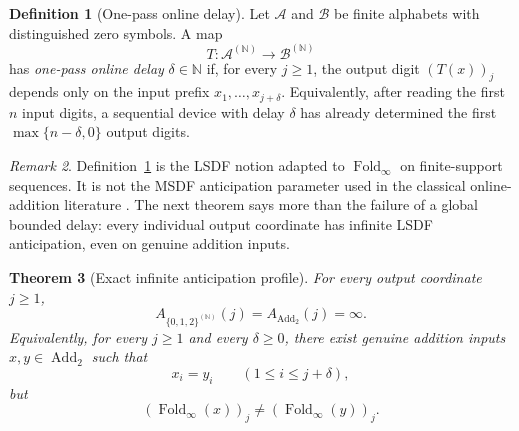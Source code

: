 \documentclass[11pt,letterpaper]{article}
\numberwithin{equation}{section}
\theoremstyle{plain}
\newtheorem{theorem}{Theorem}[section]
\theoremstyle{definition}
\newtheorem{definition}[theorem]{Definition}
\theoremstyle{remark}
\newtheorem{remark}[theorem]{Remark}
\newcommand{\NN}{\mathbb{N}}
\DeclareMathOperator{\Fold}{Fold}
\newcommand{\AddTwo}{\operatorname{Add}_{2}}
\begin{document}
\begin{definition}[One-pass online delay]\label{def:online-delay}
Let $\mathcal A$ and $\mathcal B$ be finite alphabets with distinguished zero
symbols.  A map
\[
T:\mathcal A^{(\NN)}\to \mathcal B^{(\NN)}
\]
has \emph{one-pass online delay} $\delta\in\NN$ if, for every $j\ge 1$, the
output digit $(T(x))_j$ depends only on the input prefix
$x_1,\dots,x_{j+\delta}$.  Equivalently, after reading the first $n$ input
digits, a sequential device with delay $\delta$ has already determined the
first $\max\{n-\delta,0\}$ output digits.
\end{definition}

\begin{remark}\label{rem:delay-convention}
Definition~\ref{def:online-delay} is the LSDF notion adapted to
$\Fold_\infty$ on finite-support sequences.  It is not the MSDF anticipation
parameter used in the classical online-addition literature
\cite{Frougny1999OnlineAddition}.  The next theorem says more than the failure
of a global bounded delay: every individual output coordinate has infinite
LSDF anticipation, even on genuine addition inputs.
\end{remark}

\begin{theorem}[Exact infinite anticipation profile]\label{thm:coordinatewise-unbounded-anticipation}
For every output coordinate $j\ge 1$,
\[
A_{\{0,1,2\}^{(\NN)}}(j)=A_{\AddTwo}(j)=\infty.
\]
Equivalently, for every $j\ge 1$ and every $\delta\ge 0$, there exist
genuine addition inputs $x,y\in\AddTwo$ such that
\[
x_i=y_i \qquad (1\le i\le j+\delta),
\]
but
\[
(\Fold_\infty(x))_j\neq (\Fold_\infty(y))_j.
\]
\end{theorem}
\end{document}

